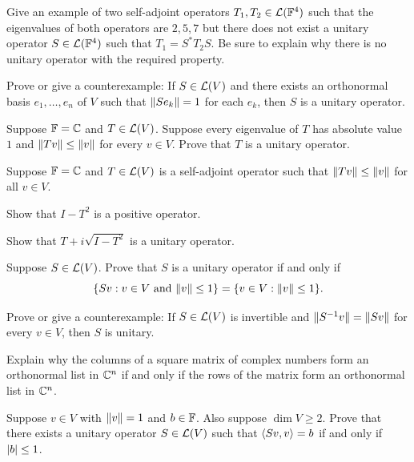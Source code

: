\begin{exc}
\begin{exercise}
Give an example of two self-adjoint operators $T_1,T_2\in\mathcal{L}(\mathbb{F}^4)$ such that
the eigenvalues of both operators are $2,5,7$ but there does not exist a unitary
operator $S\in\mathcal{L}(\mathbb{F}^4)$ such that $T_1=S^*T_2S$. Be sure to explain why there
is no unitary operator with the required property.
\end{exercise}

\begin{exercise}
Prove or give a counterexample: If $S\in\mathcal{L}(V)$ and there exists an
orthonormal basis $e_1,\dots,e_n$ of $V$ such that $\lVert Se_k \rVert=1$ for each
$e_k$, then $S$ is a unitary operator.
\end{exercise}

\begin{exercise}
Suppose $\mathbb{F}=\mathbb{C}$ and $T\in\mathcal{L}(V)$. Suppose every eigenvalue of $T$ has absolute
value $1$ and $\lVert Tv \rVert\le\lVert v \rVert$ for every $v\in V$. Prove that $T$ is a
unitary operator.
\end{exercise}

\begin{exercise}
Suppose $\mathbb{F}=\mathbb{C}$ and $T\in\mathcal{L}(V)$ is a self-adjoint operator such that
$\lVert Tv \rVert\le\lVert v \rVert$ for all $v\in V$.
\begin{parts}
\item Show that $I-T^2$ is a positive operator.
\item Show that $T+i\sqrt{I-T^2}$ is a unitary operator.
\end{parts}
\end{exercise}

\begin{exercise}
Suppose $S\in\mathcal{L}(V)$. Prove that $S$ is a unitary operator if and only if
\[ \{Sv : v\in V \text{ and } \lVert v \rVert\le1\}=\{v\in V : \lVert v \rVert\le1\}. \]
\end{exercise}

\begin{exercise}
Prove or give a counterexample: If $S\in\mathcal{L}(V)$ is invertible and
$\lVert S^{-1}v \rVert=\lVert Sv \rVert$ for every $v\in V$, then $S$ is unitary.
\end{exercise}

\begin{exercise}
Explain why the columns of a square matrix of complex numbers form an
orthonormal list in $\mathbb{C}^n$ if and only if the rows of the matrix form an
orthonormal list in $\mathbb{C}^n$.
\end{exercise}

\begin{exercise}
Suppose $v\in V$ with $\lVert v \rVert=1$ and $b\in\mathbb{F}$. Also suppose $\dim V\ge2$.
Prove that there exists a unitary operator $S\in\mathcal{L}(V)$ such that
$\langle Sv, v \rangle=b$ if and only if $\lvert b \rvert\le1$.
\end{exercise}


\end{exc}

